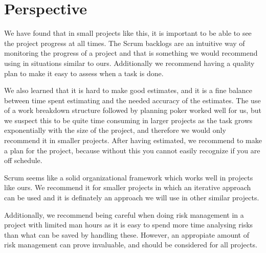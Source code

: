 \section{Perspective}
We have found that in small projects like this, it is important to be able to see the project progress at all times. The Scrum
backlogs are an intuitive way of monitoring the progress of a project and that is something we
would recommend using in situations similar to ours. Additionally we recommend having a quality plan to make it
easy to assess when a task is done.

We also learned that it is hard to make good estimates, and it is a fine
balance between time spent estimating and the needed accuracy of the estimates.
The use of a work breakdown structure followed by planning poker worked well for
us, but we suspect this to be quite time consuming in larger projects as the task grows exponentially with the
size of the project, and therefore we would only recommend it in smaller
projects. After having estimated, we recommend to make a plan for the project, because without
 this you cannot easily recognize if you are off schedule.

Scrum seems like a solid organizational framework which works well in projects like ours. We
recommend it for smaller projects in which an iterative approach can be
used and it is definately an approach we will use in other similar projects. 

Additionally, we recommend being careful when doing risk management in a project with limited man hours 
as it is easy to spend more time analysing risks than what can be saved by handling these. However, an appropiate amount of 
risk management can prove invaluable, and should be considered for all projects.